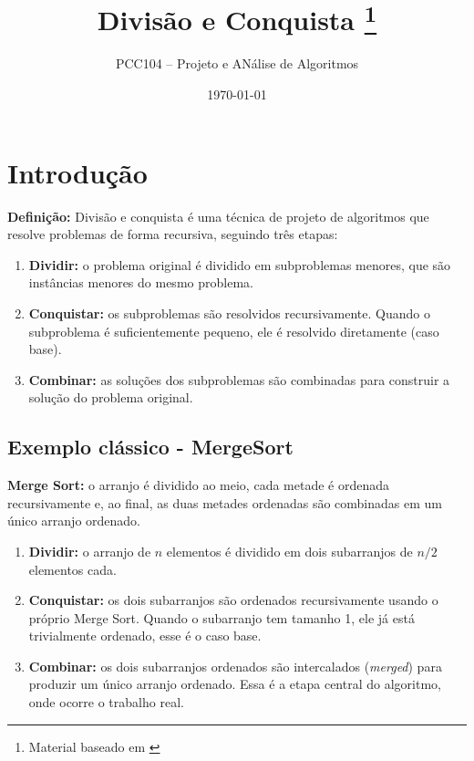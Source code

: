 \documentclass[9pt,a4paper]{extarticle}
\begin{document}
\title{Divisão e Conquista \footnote{Material baseado em \citep{cormen2022algoritmos}}}
\author{PCC104 -- Projeto e ANálise de Algoritmos}
\date{\today}
\maketitle

\tableofcontents

\section{Introdução}

\textbf{Definição:} Divisão e conquista é uma técnica de projeto de algoritmos que resolve problemas de forma recursiva, seguindo três etapas:

\begin{enumerate}%
    \item \textbf{Dividir:} o problema original é dividido em subproblemas menores, que são instâncias menores do mesmo problema.

    \item \textbf{Conquistar:} os subproblemas são resolvidos recursivamente. Quando o subproblema é suficientemente pequeno, ele é resolvido
          diretamente (caso base).

    \item \textbf{Combinar:} as soluções dos subproblemas são combinadas para construir a solução do problema original.
\end{enumerate}

\subsection{Exemplo clássico - MergeSort}

\textbf{Merge Sort:} o arranjo é dividido ao meio, cada metade é ordenada recursivamente e, ao final, as duas metades ordenadas são combinadas em um único arranjo ordenado.

\begin{enumerate}
    \item \textbf{Dividir:} o arranjo de $n$ elementos é dividido em dois subarranjos de $n/2$ elementos cada.

    \item \textbf{Conquistar:} os dois subarranjos são ordenados recursivamente usando o próprio Merge Sort. Quando o subarranjo tem tamanho 1, ele já está trivialmente ordenado, esse é o caso base.

    \item \textbf{Combinar:} os dois subarranjos ordenados são intercalados (\textit{merged}) para produzir um único arranjo ordenado. Essa é a etapa central do algoritmo, onde ocorre o trabalho real.
\end{enumerate}
\end{document}
